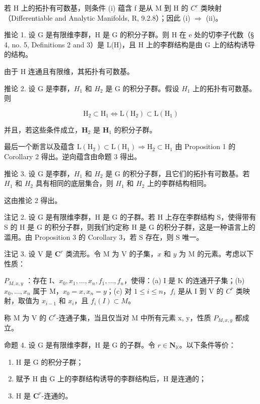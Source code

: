 若 H 上的拓扑有可数基，则条件 (i) 蕴含 f 是从 M 到 H 的 \(C^{r}\) 类映射（Differentiable and Analytic Manifolds, R, 9.2.8）；因此 (i) \(\Rightarrow\) (ii)。

推论 1. 设 G 是有限维李群，H 是 G 的积分子群。则 H 在 e 处的切李子代数（§ 4, no. 5, Definitions 2 and 3）是 L(H)，且 H 上的李群结构是由 G 上的结构诱导的结构。

由于 H 连通且有限维，其拓扑有可数基。

推论 2. 设 G 是李群，\(H_{1}\) 和 \(H_{2}\) 是 G 的积分子群。假设 \(H_{1}\) 上的拓扑有可数基。则

\[
\mathrm{H} _ {2} \subset \mathrm{H} _ {1} \Leftrightarrow \mathrm{L} (\mathrm{H} _ {2}) \subset \mathrm{L} (\mathrm{H} _ {1})
\]

并且，若这些条件成立，\(\mathbf{H}_2\) 是 \(\mathbf{H}_1\) 的积分子群。

最后一个断言以及蕴含 \(\mathrm{L}(\mathrm{H}_{2})\subset\mathrm{L}(\mathrm{H}_{1})\Rightarrow\mathrm{H}_{2}\subset\mathrm{H}_{1}\) 由 Proposition 1 的 Corollary 2 得出。逆向蕴含由命题 3 得出。

推论 3. 设 G 是李群，\(H_{1}\) 和 \(H_{2}\) 是 G 的积分子群，且它们的拓扑有可数基。若 \(H_{1}\) 和 \(H_{2}\) 具有相同的底层集合，则 \(H_{1}\) 和 \(H_{2}\) 上的李群结构相同。

这由推论 2 得出。

注记 2. 设 G 是有限维李群，H 是 G 的子群。若 H 上存在李群结构 S，使得带有 S 的 H 是 G 的积分子群，则我们约定称 H 是 G 的积分子群，这是一种语言上的滥用。由 Proposition 3 的 Corollary 3，若 S 存在，则 S 唯一。

注记 3. 设 V 是 \(\mathbf{C}^r\) 类流形。令 M 为 V 的子集，\(x\) 和 \(y\) 为 M 的元素。考虑以下性质：

\(P_{M,x,y}\) ：存在 I、\(x_{0}, x_{1}, \ldots, x_{n}, f_{1}, \ldots, f_{n}\)，使得：(a) I 是 K 的连通开子集；(b) \(x_{0}, \ldots, x_{n}\) 属于 M，\(x_{0} = x, x_{n} = y\)；(c) 对 \(1 \leqslant i \leqslant n\)，\(f_{i}\) 是从 I 到 V 的 \(C^{r}\) 类映射，取值为 \(x_{i-1}\) 和 \(x_{i}\)，且 \(f_{i}(I) \subset M\)。

称 M 为 V 的 \(C^{r}\)-连通子集，当且仅当对 M 中所有元素 x, y，性质 \(P_{M,x,y}\) 都成立。

命题 4. 设 G 是有限维李群，H 是 G 的子群。令 \(r \in \mathbf{N}_{\mathbb{K}}\)。以下条件等价：

\begin{enumerate}
\def\labelenumi{(\roman{enumi})}
\item
  H 是 G 的积分子群；
\item
  赋予 H 由 G 上的李群结构诱导的李群结构后，H 是连通的；
\item
  H 是 \(\mathbf{C}^r\)-连通的。
\end{enumerate}

